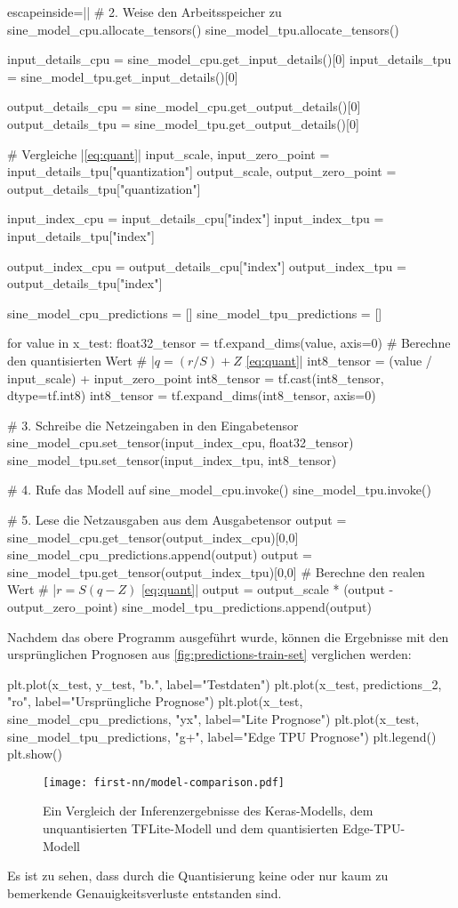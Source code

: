 \begin{pythoncode*}{escapeinside=||}
# 2. Weise den Arbeitsspeicher zu
sine_model_cpu.allocate_tensors()
sine_model_tpu.allocate_tensors()

input_details_cpu = sine_model_cpu.get_input_details()[0]
input_details_tpu = sine_model_tpu.get_input_details()[0]

output_details_cpu = sine_model_cpu.get_output_details()[0]
output_details_tpu = sine_model_tpu.get_output_details()[0]

# Vergleiche |\autoref{eq:quant}|
input_scale, input_zero_point = input_details_tpu["quantization"]
output_scale, output_zero_point = output_details_tpu["quantization"]

input_index_cpu = input_details_cpu["index"]
input_index_tpu = input_details_tpu["index"]

output_index_cpu = output_details_cpu["index"]
output_index_tpu = output_details_tpu["index"]

sine_model_cpu_predictions = []
sine_model_tpu_predictions = []

for value in x_test:
    float32_tensor = tf.expand_dims(value, axis=0)
    # Berechne den quantisierten Wert
    # |$q = (r / S) + Z$ \eqref{eq:quant}|
    int8_tensor = (value / input_scale) + input_zero_point
    int8_tensor = tf.cast(int8_tensor, dtype=tf.int8)
    int8_tensor = tf.expand_dims(int8_tensor, axis=0)
    
    # 3. Schreibe die Netzeingaben in den Eingabetensor
    sine_model_cpu.set_tensor(input_index_cpu, float32_tensor)
    sine_model_tpu.set_tensor(input_index_tpu, int8_tensor)

    # 4. Rufe das Modell auf
    sine_model_cpu.invoke()
    sine_model_tpu.invoke()
    
    # 5. Lese die Netzausgaben aus dem Ausgabetensor
    output = sine_model_cpu.get_tensor(output_index_cpu)[0,0]
    sine_model_cpu_predictions.append(output)
    output = sine_model_tpu.get_tensor(output_index_tpu)[0,0]
    # Berechne den realen Wert
    # |$r = S(q - Z)$ \eqref{eq:quant}|
    output = output_scale * (output - output_zero_point) 
    sine_model_tpu_predictions.append(output)
\end{pythoncode*}
Nachdem das obere Programm ausgeführt wurde, können die Ergebnisse
mit den ursprünglichen Prognosen aus \autoref{fig:predictions-train-set}
verglichen werden:
\begin{pythoncode}
plt.plot(x_test, y_test, "b.", label="Testdaten")
plt.plot(x_test, predictions_2, "ro", label="Ursprüngliche Prognose")
plt.plot(x_test, sine_model_cpu_predictions, "yx", label="Lite Prognose")
plt.plot(x_test, sine_model_tpu_predictions, "g+", label="Edge TPU Prognose")
plt.legend()
plt.show()
\end{pythoncode}
\begin{figure}[h!]
  \centering
  \texttt{[image: first-nn/model-comparison.pdf]}
  \caption{Ein Vergleich der Inferenzergebnisse des Keras-Modells, dem unquantisierten
  TFLite-Modell und dem quantisierten Edge-TPU-Modell}
  \label{fig:predictions-train-set}
\end{figure}
Es ist zu sehen, dass durch die Quantisierung keine oder nur kaum
zu bemerkende Genauigkeitsverluste entstanden sind.


